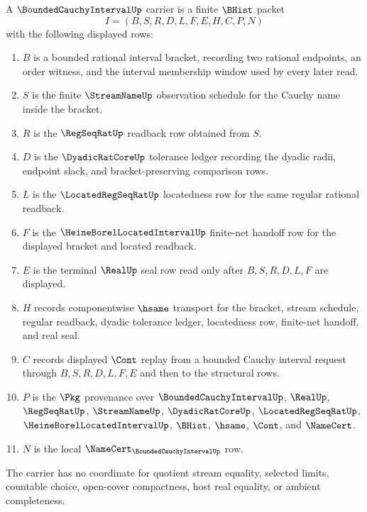 \begin{definition}
\label{def:bounded-cauchy-interval-carrier}
A $\BoundedCauchyIntervalUp$ carrier is a finite $\BHist$ packet
$$
I=(B,S,R,D,L,F,E,H,C,P,N)
$$
with the following displayed rows:
\begin{enumerate}
\item $B$ is a bounded rational interval bracket, recording two rational endpoints, an order witness, and the interval membership window used by every later read.
\item $S$ is the finite $\StreamNameUp$ observation schedule for the Cauchy name inside the bracket.
\item $R$ is the $\RegSeqRatUp$ readback row obtained from $S$.
\item $D$ is the $\DyadicRatCoreUp$ tolerance ledger recording the dyadic radii, endpoint slack, and bracket-preserving comparison rows.
\item $L$ is the $\LocatedRegSeqRatUp$ locatedness row for the same regular rational readback.
\item $F$ is the $\HeineBorelLocatedIntervalUp$ finite-net handoff row for the displayed bracket and located readback.
\item $E$ is the terminal $\RealUp$ seal row read only after $B,S,R,D,L,F$ are displayed.
\item $H$ records componentwise $\hsame$ transport for the bracket, stream schedule, regular readback, dyadic tolerance ledger, locatedness row, finite-net handoff, and real seal.
\item $C$ records displayed $\Cont$ replay from a bounded Cauchy interval request through $B,S,R,D,L,F,E$ and then to the structural rows.
\item $P$ is the $\Pkg$ provenance over $\BoundedCauchyIntervalUp$, $\RealUp$, $\RegSeqRatUp$, $\StreamNameUp$, $\DyadicRatCoreUp$, $\LocatedRegSeqRatUp$, $\HeineBorelLocatedIntervalUp$, $\BHist$, $\hsame$, $\Cont$, and $\NameCert$.
\item $N$ is the local $\NameCert_{\BoundedCauchyIntervalUp}$ row.
\end{enumerate}
The carrier has no coordinate for quotient stream equality, selected limits, countable choice, open-cover compactness, host real equality, or ambient completeness.
\end{definition}

